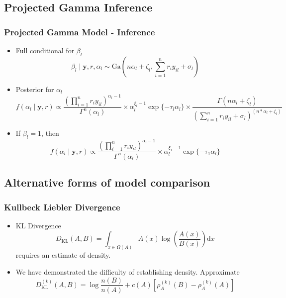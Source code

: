 \documentclass[aspectratio=169]{beamer}
\begin{document}
\subsection*{Projected Gamma Inference}
\begin{frame}
  \frametitle{Projected Gamma Model - Inference}
  \begin{itemize}
    \item Full conditional for $\beta_l$
      \begin{equation*}
        \beta_l\mid \bm{ y}, r, \alpha_l \sim \text{Ga}\left(n\alpha_l + \zeta_l,
                {\textstyle \sum}_{i = 1}^nr_iy_{il} + \sigma_l\right)
      \end{equation*}
    \pause
    \item Posterior for $\alpha_l$
      \begin{equation*}
        f(\alpha_l \mid \bm{ y}, r) \propto
          \frac{\left({\textstyle \prod}_{i = 1}^nr_iy_{il}\right)^{\alpha_l - 1}}{
            \Gamma^n(\alpha_l)} \times \alpha_l^{\xi_l - 1}\exp\{-\tau_l\alpha_l\} \times
            \frac{\Gamma(n\alpha_l + \zeta_l)}{
            \left({\textstyle\sum}_{i = 1}^n r_iy_{il} + \sigma_l
                  \right)^{(n * \alpha_l + \zeta_l)}}
      \end{equation*}
    \pause
    \item If $\beta_l = 1$, then
    \begin{equation*}
      f(\alpha_l \mid \bm{ y}, r) \propto
        \frac{\left({\textstyle\prod}_{i = 1}^n r_iy_{il}\right)^{\alpha_l - 1}}{\Gamma^n(\alpha_l)} \times
        \alpha_l^{\xi_1 - 1}\exp\{-\tau_1\alpha_l\}
    \end{equation*}
  \end{itemize}
\end{frame}



\subsection*{Alternative forms of model comparison}
\begin{frame}
  \frametitle{Kullbeck Liebler Divergence}
  \begin{itemize}
    \item KL Divergence
      \begin{equation*}
        D_{\text{KL}}(A,B) = \int_{x\in \Omega(A)}A(x)\log\left(\frac{A(x)}{B(x)}\right)\text{d}x
      \end{equation*}
      requires an estimate of density.
    \pause
    \item We have demonstrated the difficulty of establishing density.  Approximate
      \begin{equation*}
      D_{\text{KL}}^{(k)}(A,B) = \log\frac{n(B)}{n(A)} + c(A) \left[\rho_A^{(k)}(B)
                                                      - \rho_A^{(k)}(A)\right]
      \end{equation*}
  \end{itemize}
\end{frame} %
\end{document}

